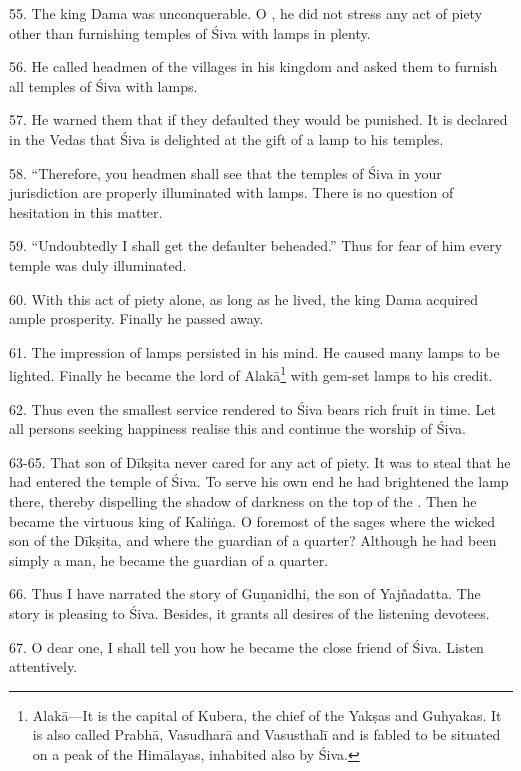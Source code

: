 55. The king Dama was unconquerable. O , he did not stress any act
of piety other than furnishing temples of Śiva with lamps in plenty.

56. He called headmen of the villages in his kingdom and asked them to furnish
all temples of Śiva with lamps.

57. He warned them that if they defaulted they would be punished. It is declared
in the Vedas that Śiva is delighted at the gift of a lamp to his temples.

58. “Therefore, you headmen shall see that the temples of Śiva in your
jurisdiction are properly illuminated with lamps. There is no question of
hesitation in this matter.

59. “Undoubtedly I shall get the defaulter beheaded.” Thus for fear of him every
temple was duly illuminated.

60. With this act of piety alone, as long as he lived, the king Dama acquired
ample prosperity. Finally he passed away.

61. The impression of lamps persisted in his mind. He caused many lamps to be
lighted. Finally he became the lord of Alakā\footnote{Alakā—It is the capital of
Kubera, the chief of the Yakṣas and Guhyakas. It is also called Prabhā, Vasudharā
and Vasusthalī and is fabled to be situated on a peak of the Himālayas, inhabited
also by Śiva.} with gem-set lamps to his credit.

62. Thus even the smallest service rendered to Śiva bears rich fruit in time.
Let all persons seeking happiness realise this and continue the worship of Śiva.

63-65. That son of Dīkṣita never cared for any act of piety. It was to steal
that he had entered the temple of Śiva. To serve his own end he had brightened
the lamp there, thereby dispelling the shadow of darkness on the top of the
. Then he became the virtuous king of Kaliṅga. O foremost of the sages
where the wicked son of the Dīkṣita, and where the guardian of a quarter?
Although he had been simply a man, he became the guardian of a quarter.

66. Thus I have narrated the story of Guṇanidhi, the son of Yajñadatta. The story
is pleasing to Śiva. Besides, it grants all desires of the listening devotees.

67. O dear one, I shall tell you how he became the close friend of Śiva.
Listen attentively.
